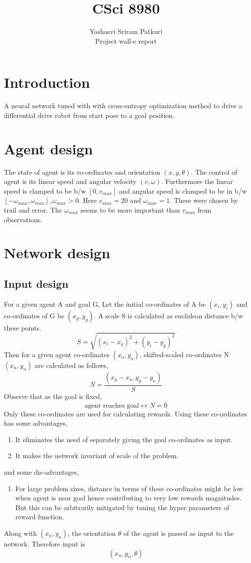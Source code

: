 \documentclass[12pt]{article}
\title{CSci 8980}
\author{Yashasvi Sriram Patkuri\\Project wall-e report}
\newcommand{\biimpl}{\longleftrightarrow}
\begin{document}
\maketitle
\pagebreak

\section{Introduction}
A neural network tuned with with cross-entropy optimization method to drive a differential drive robot from start pose to a goal position.

\section{Agent design}
The state of agent is its co-ordinates and orientation $(x, y, \theta)$.
The control of agent is its linear speed and angular velocity $(v, \omega)$.
Furthermore the linear speed is clamped to be b/w $[0, v_{max}]$ and angular speed is clamped to be in b/w $[-\omega_{max}, \omega_{max}], \omega_{max} > 0$.
Here $v_{max} = 20$ and $\omega_{max} = 1$.
These were chosen by trail and error.
The $\omega_{max}$ seems to be more important than $v_{max}$ from observations.
\section{Network design}

\subsection{Input design}
For a given agent A and goal G,
Let the initial co-ordinates of A be $(x_i, y_i)$ and co-ordinates of G be $(x_g, y_g)$.
A scale S is calculated as euclidean distance b/w these points.
\[
    S = \sqrt{(x_i - x_g)^2 + (y_i - y_g)^2}
\]
Then for a given agent co-ordinates $(x_a, y_a)$, shifted-scaled co-ordinates N$(x_n, y_n)$ are calculated as follows,
\[
    N = \frac{(x_g - x_a, y_g - y_a)}{S}
\]
Observe that as the goal is fixed,
\[
    \text{agent reaches goal} \biimpl N = \bar{0}
\]
Only these co-ordinates are used for calculating rewards.
Using these co-ordinates has some advantages,
\begin{enumerate}[nolistsep]
    \item It eliminates the need of separately giving the goal co-ordinates as input.
    \item It makes the network invariant of scale of the problem.
\end{enumerate}
and some dis-advantages,
\begin{enumerate}[nolistsep]
    \item For large problem sizes, distance in terms of these co-ordinates might be low when agent is near goal hence contributing to very low rewards magnitudes.
        But this can be arbitrarily mitigated by tuning the hyper parameters of reward function.
\end{enumerate}
Along with $(x_n, y_n)$, the orientation $\theta$ of the agent is passed as input to the network. Therefore input is
\[
    (x_n, y_n, \theta)
\]
\end{document}
